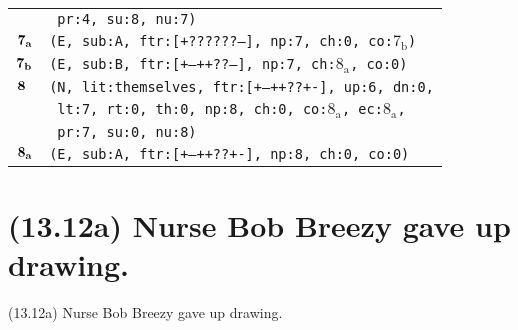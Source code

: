 \documentclass{article}
\begin{document}
\begin{minipage}{\textwidth}
{\begin{tabular}{|r|l|}
    & \texttt{\texttt{~pr:4,~su:8,~nu:7)}} \\
    ${\textbf{\textrm{7}}_{\textbf{\textrm{a}}}}$ & \texttt{\texttt{(E,~sub:A,~ftr:[+??????--],~np:7,~ch:0,~co:${\textrm{7}_{\textrm{b}}}$)}} \\
    ${\textbf{\textrm{7}}_{\textbf{\textrm{b}}}}$ & \texttt{\texttt{(E,~sub:B,~ftr:[+--++??--],~np:7,~ch:${\textrm{8}_{\textrm{a}}}$,~co:0)}} \\
    ${\textbf{\textrm{8}}_{\phantom{z}}}$ & \texttt{\texttt{(N,~lit:themselves,~ftr:[+--++??+-],~up:6,~dn:0,}} \\
    & \texttt{\texttt{~lt:7,~rt:0,~th:0,~np:8,~ch:0,~co:${\textrm{8}_{\textrm{a}}}$,~ec:${\textrm{8}_{\textrm{a}}}$,}} \\
    & \texttt{\texttt{~pr:7,~su:0,~nu:8)}} \\
    ${\textbf{\textrm{8}}_{\textbf{\textrm{a}}}}$ & \texttt{\texttt{(E,~sub:A,~ftr:[+--++??+-],~np:8,~ch:0,~co:0)}} \\
    \hline
  \end{tabular}
  }
\end{minipage}
\bigbreak

\clearpage

%
%

\section*{(13.12a) Nurse Bob Breezy gave up drawing.}

\bigbreak
\begin{enumerate*}
\item[(13.12a)] Nurse Bob Breezy gave up drawing.
\end{enumerate*}
\bigbreak
\end{document}
